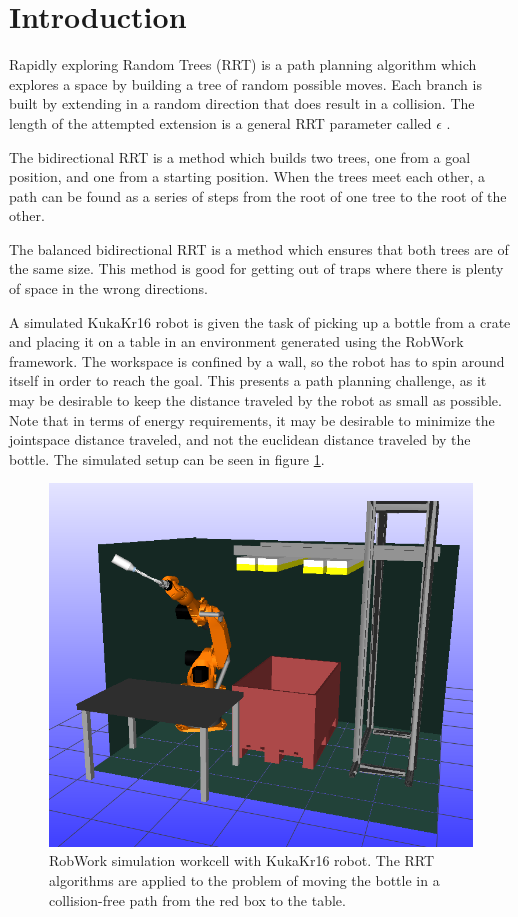 \section{Introduction} 

Rapidly exploring Random Trees (RRT) is a path planning algorithm which explores
a space by building a tree of random possible moves.
Each branch is built by extending in a random direction that does result in a collision.
The length of the attempted extension is a general RRT parameter called \(\epsilon\)
\citep{pathplanning}.

The bidirectional RRT is a method which builds two trees,
one from a goal position, and one from a starting position.
When the trees meet each other, a path can be found as a series of steps
from the root of one tree to the root of the other.

The balanced bidirectional RRT is a method which ensures that both trees are of the same size. 
This method is good for getting out of traps where there is plenty of space in the wrong directions.

A simulated KukaKr16 robot \citep{kukakr16} is given the task of picking
up a bottle from a crate and placing it on a table in an environment
generated using the RobWork \citep{robwork} framework.
The workspace is confined by a wall, so the robot has to spin
around itself in order to reach the goal. This presents a path planning
challenge, as it may be desirable to keep the distance traveled by the robot
as small as possible. Note that in terms of energy requirements,
it may be desirable to minimize the jointspace distance traveled, and not the
euclidean distance traveled by the bottle.
The simulated setup can be seen in figure \ref{fig:worckcell_bottle_picked}.

\begin{figure}[h]
 \centering
 \includegraphics[width=\figsize]{graphics/robworkpic}
 \caption{RobWork simulation workcell with KukaKr16 robot.
 The RRT algorithms are applied to the problem of moving the bottle
 in a collision-free path from the red box to the table.}
 \label{fig:worckcell_bottle_picked}
\end{figure}

